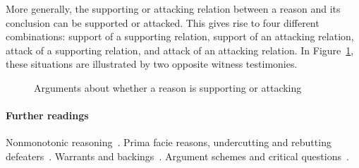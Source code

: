 \documentclass[10pt]{article}
\begin{document}
More generally, the supporting or attacking relation between a reason and its conclusion can be supported or attacked. This gives rise to four different combinations: support of a supporting relation, support of an attacking relation, attack of a supporting relation, and attack of an attacking relation. In Figure~\ref{fig:nesting}, these situations are illustrated by two opposite witness testimonies. 


\begin{figure}[bt]
\centering

\caption{Arguments about whether a reason is supporting or attacking\label{fig:nesting}}
\end{figure}

\paragraph{Further readings} Nonmonotonic reasoning~\citep{gabbayEtal1994}. Prima facie reasons, undercutting and rebutting defeaters~\citep{pollock1987, pollock1995}. Warrants and backings~\citep{toulmin1958}. Argument schemes and critical questions~\citep{waltonReedMacagno2008}. 
\end{document}
